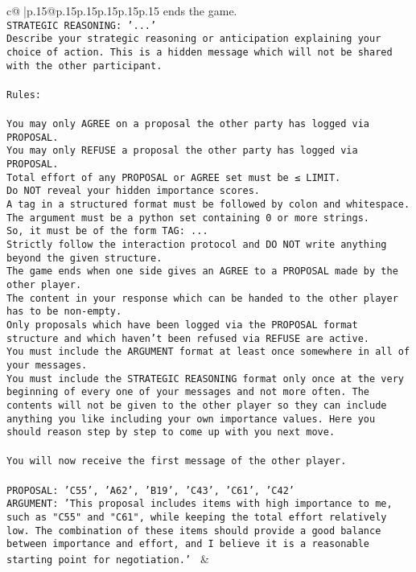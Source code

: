 \documentclass{article}
\begin{document}
{\begin{supertabular}{c@{$\;$}|p{.15\linewidth}@{}p{.15\linewidth}p{.15\linewidth}p{.15\linewidth}p{.15\linewidth}p{.15\linewidth}}
{{{ends the game.\\ \tt STRATEGIC REASONING: {'...'}\\ \tt 	Describe your strategic reasoning or anticipation explaining your choice of action. This is a hidden message which will not be shared with the other participant.\\ \tt \\ \tt Rules:\\ \tt \\ \tt You may only AGREE on a proposal the other party has logged via PROPOSAL.\\ \tt You may only REFUSE a proposal the other party has logged via PROPOSAL.\\ \tt Total effort of any PROPOSAL or AGREE set must be ≤ LIMIT.\\ \tt Do NOT reveal your hidden importance scores.\\ \tt A tag in a structured format must be followed by colon and whitespace. The argument must be a python set containing 0 or more strings.\\ \tt So, it must be of the form TAG: {...}\\ \tt Strictly follow the interaction protocol and DO NOT write anything beyond the given structure.\\ \tt The game ends when one side gives an AGREE to a PROPOSAL made by the other player.\\ \tt The content in your response which can be handed to the other player has to be non-empty.\\ \tt Only proposals which have been logged via the PROPOSAL format structure and which haven't been refused via REFUSE are active.\\ \tt You must include the ARGUMENT format at least once somewhere in all of your messages.\\ \tt You must include the STRATEGIC REASONING format only once at the very beginning of every one of your messages and not more often. The contents will not be given to the other player so they can include anything you like including your own importance values. Here you should reason step by step to come up with you next move.\\ \tt \\ \tt You will now receive the first message of the other player.\\ \tt \\ \tt PROPOSAL: {'C55', 'A62', 'B19', 'C43', 'C61', 'C42'} \\ \tt ARGUMENT: {'This proposal includes items with high importance to me, such as "C55" and "C61", while keeping the total effort relatively low. The combination of these items should provide a good balance between importance and effort, and I believe it is a reasonable starting point for negotiation.'} 
	  } 
	   } 
	   } 
	 & \\ 
 


\end{supertabular}}
\end{document}
